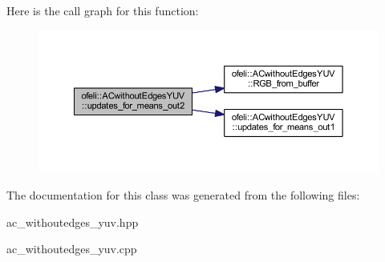 Here is the call graph for this function\-:\nopagebreak
\begin{figure}[H]
\begin{center}
\leavevmode
\includegraphics[width=350pt]{classofeli_1_1_a_cwithout_edges_y_u_v_a43b463f3b8d5cb9604fd73b18083409a_cgraph}
\end{center}
\end{figure}




The documentation for this class was generated from the following files\-:\begin{DoxyCompactItemize}
\item 
ac\-\_\-withoutedges\-\_\-yuv.\-hpp\item 
ac\-\_\-withoutedges\-\_\-yuv.\-cpp\end{DoxyCompactItemize}
